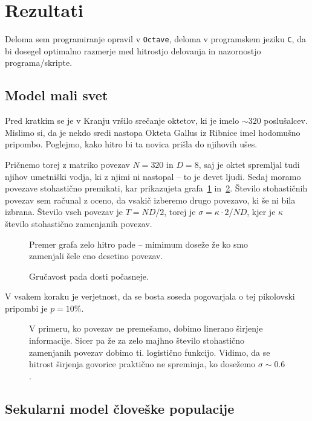 \documentclass[a4 paper, 12pt]{article}
\begin{document}
\section{Rezultati}

Deloma sem programiranje opravil v {\tt Octave}, deloma v programskem jeziku {\tt C}, da bi dosegel optimalno
razmerje med hitrostjo delovanja in nazornostjo programa/skripte.

\subsection{Model mali svet}

Pred kratkim se je v Kranju vr\v silo sre\v canje oktetov, ki je imelo $\sim 320$ poslu\v salcev. Mislimo si, da
je nekdo sredi nastopa Okteta Gallus iz Ribnice imel hodomu\v sno pripombo. Poglejmo, kako hitro bi ta novica pri\v sla
do njihovih u\v ses.

Pri\v cnemo torej z matriko povezav $N = 320$ in $D = 8$, saj je oktet spremljal tudi njihov umetni\v ski vodja, ki
z njimi ni nastopal -- to je devet ljudi. Sedaj moramo povezave stohasti\v cno premikati, kar prikazujeta grafa~\ref{gr1}
in~\ref{gr2}. \v Stevilo stohasti\v cnih povezav sem ra\v cunal z oceno, da vsaki\v c izberemo drugo povezavo, ki \v se
ni bila izbrana. \v Stevilo vseh povezav je $T = ND/2$, torej je $\sigma = \kappa \cdot 2/ND$, kjer je $\kappa$ \v stevilo
stohasti\v cno zamenjanih povezav.
\begin{figure}[H]\centering
	
	\caption{Premer grafa zelo hitro pade -- mimimum dose\v ze \v ze ko smo zamenjali \v sele eno desetino povezav.}
	\label{gr1}
\end{figure}
\begin{figure}[H]\centering
	
	\caption{Gru\v cavost pada dosti po\v casneje.}
	\label{gr2}
\end{figure}

V vsakem koraku je verjetnost, da se bosta soseda pogovarjala o tej pikolovski pripombi je $p = 10\%$.
\begin{figure}[H]\centering
	
	\caption{V primeru, ko povezav ne preme\v samo, dobimo linerano \v sirjenje informacije. Sicer
		pa \v ze za zelo majhno \v stevilo stohasti\v cno zamenjanih povezav dobimo ti. logisti\v cno funkcijo.
		Vidimo, da se hitrost \v sirjenja govorice prakti\v cno ne spreminja, ko dose\v zemo $\sigma \sim 0.6$.}
	\label{gr3}
\end{figure}

\subsection{Sekularni model \v clove\v ske populacije}
\end{document}
